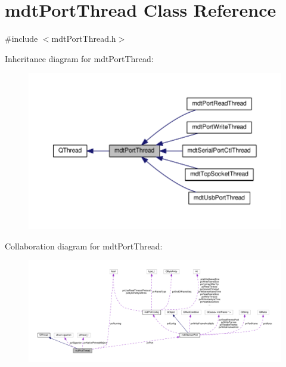 \hypertarget{classmdt_port_thread}{\section{mdt\-Port\-Thread Class Reference}
\label{classmdt_port_thread}
}


{\ttfamily \#include $<$mdt\-Port\-Thread.\-h$>$}



Inheritance diagram for mdt\-Port\-Thread\-:\nopagebreak
\begin{figure}[H]
\begin{center}
\leavevmode
\includegraphics[width=350pt]{classmdt_port_thread__inherit__graph}
\end{center}
\end{figure}


Collaboration diagram for mdt\-Port\-Thread\-:\nopagebreak
\begin{figure}[H]
\begin{center}
\leavevmode
\includegraphics[width=350pt]{classmdt_port_thread__coll__graph}
\end{center}
\end{figure}
